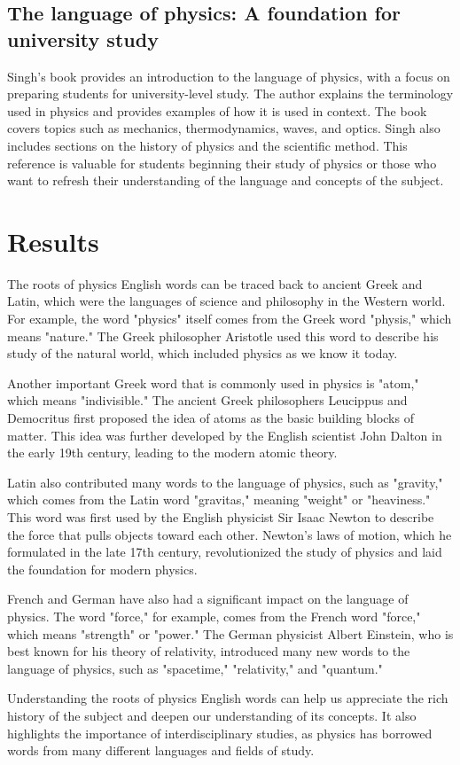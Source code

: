\documentclass{phyasgn}\usepackage{nag}
\begin{document}
\subsection{The language of physics: A foundation for university study\cite{3}}
Singh's book provides an introduction to the language of physics, with a focus on preparing students for university-level study. The author explains the terminology used in physics and provides examples of how it is used in context. The book covers topics such as mechanics, thermodynamics, waves, and optics. Singh also includes sections on the history of physics and the scientific method. This reference is valuable for students beginning their study of physics or those who want to refresh their understanding of the language and concepts of the subject.
\section{Results}
The roots of physics English words can be traced back to ancient Greek and Latin, which were the languages of science and philosophy in the Western world. For example, the word "physics" itself comes from the Greek word "physis," which means "nature." The Greek philosopher Aristotle used this word to describe his study of the natural world, which included physics as we know it today.
\par Another important Greek word that is commonly used in physics is "atom," which means "indivisible." The ancient Greek philosophers Leucippus and Democritus first proposed the idea of atoms as the basic building blocks of matter. This idea was further developed by the English scientist John Dalton in the early 19th century, leading to the modern atomic theory.
\par Latin also contributed many words to the language of physics, such as "gravity," which comes from the Latin word "gravitas," meaning "weight" or "heaviness." This word was first used by the English physicist Sir Isaac Newton to describe the force that pulls objects toward each other. Newton's laws of motion, which he formulated in the late 17th century, revolutionized the study of physics and laid the foundation for modern physics.
\par French and German have also had a significant impact on the language of physics. The word "force," for example, comes from the French word "force," which means "strength" or "power." The German physicist Albert Einstein, who is best known for his theory of relativity, introduced many new words to the language of physics, such as "spacetime," "relativity," and "quantum."
\par Understanding the roots of physics English words can help us appreciate the rich history of the subject and deepen our understanding of its concepts. It also highlights the importance of interdisciplinary studies, as physics has borrowed words from many different languages and fields of study.
\end{document}
